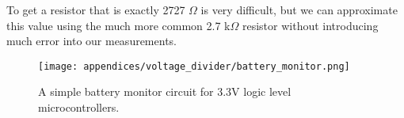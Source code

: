     To get a resistor that is exactly 2727 $\Omega$ is very difficult, but we can approximate this value using the much more common 2.7 k$\Omega$ resistor without introducing much error into our measurements.

    \begin{figure}[h!]
        \caption{A simple battery monitor circuit for 3.3V logic level microcontrollers.}
        \centering
        \texttt{[image: appendices/voltage\_divider/battery\_monitor.png]}
    \end{figure}